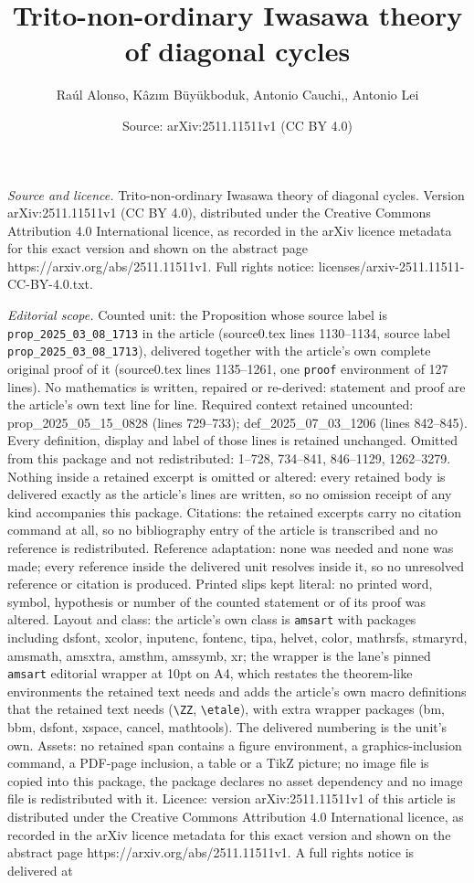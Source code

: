 \documentclass[10pt,a4paper]{amsart}
\title[Trito-non-ordinary Iwasawa theory of diagonal cycles]{Trito-non-ordinary Iwasawa theory of diagonal cycles}
\author{Ra\'ul Alonso, K\^az{\i}m B\"uy\"ukboduk, Antonio Cauchi,, Antonio Lei}
\date{Source: arXiv:2511.11511v1 (CC BY 4.0)}
\begin{document}
\maketitle

\noindent\emph{Source and licence.} Trito-non-ordinary Iwasawa theory of diagonal cycles. Version arXiv:2511.11511v1 (CC BY 4.0), distributed under the Creative Commons Attribution 4.0 International licence, as recorded in the arXiv licence metadata for this exact version and shown on the abstract page https://arxiv.org/abs/2511.11511v1. Full rights notice: licenses/arxiv-2511.11511-CC-BY-4.0.txt.\par\smallskip

\noindent\textit{Editorial scope.} Counted unit: the Proposition whose source label is \texttt{prop\_2025\_03\_08\_1713} in the article (source0.tex lines 1130--1134, source label \texttt{prop\_2025\_03\_08\_1713}), delivered together with the article's own complete original proof of it (source0.tex lines 1135--1261, one \texttt{proof} environment of 127 lines). No mathematics is written, repaired or re-derived: statement and proof are the article's own text line for line. Required context retained uncounted: prop\_2025\_05\_15\_0828 (lines 729--733); def\_2025\_07\_03\_1206 (lines 842--845). Every definition, display and label of those lines is retained unchanged. Omitted from this package and not redistributed: 1--728, 734--841, 846--1129, 1262--3279. Nothing inside a retained excerpt is omitted or altered: every retained body is delivered exactly as the article's lines are written, so no omission receipt of any kind accompanies this package. Citations: the retained excerpts carry no citation command at all, so no bibliography entry of the article is transcribed and no reference is redistributed. Reference adaptation: none was needed and none was made; every reference inside the delivered unit resolves inside it, so no unresolved reference or citation is produced. Printed slips kept literal: no printed word, symbol, hypothesis or number of the counted statement or of its proof was altered. Layout and class: the article's own class is \texttt{amsart} with packages including dsfont, xcolor, inputenc, fontenc, tipa, helvet, color, mathrsfs, stmaryrd, amsmath, amsxtra, amsthm, amssymb, xr; the wrapper is the lane's pinned \texttt{amsart} editorial wrapper at 10pt on A4, which restates the theorem-like environments the retained text needs and adds the article's own macro definitions that the retained text needs (\texttt{\textbackslash ZZ}, \texttt{\textbackslash etale}), with extra wrapper packages (bm, bbm, dsfont, xspace, cancel, mathtools). The delivered numbering is the unit's own. Assets: no retained span contains a figure environment, a graphics-inclusion command, a PDF-page inclusion, a table or a TikZ picture; no image file is copied into this package, the package declares no asset dependency and no image file is redistributed with it. Licence: version arXiv:2511.11511v1 of this article is distributed under the Creative Commons Attribution 4.0 International licence, as recorded in the arXiv licence metadata for this exact version and shown on the abstract page https://arxiv.org/abs/2511.11511v1. A full rights notice is delivered at 
\end{document}
